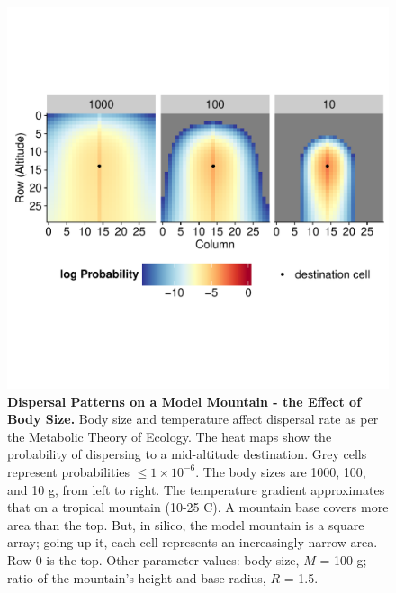 \documentclass[11pt]{article}
\begin{document}
\newpage
\begin{figure}[!hbtp]
		\includegraphics[]{../Results/DispMaps/AreaTemp.pdf}
		\vspace*{-4cm}
		\caption{\textbf{Dispersal Patterns on a Model Mountain - the Effect of Body Size.} Body size and temperature affect dispersal rate as per the Metabolic Theory of Ecology. The heat maps show the probability of dispersing to a mid-altitude destination. Grey cells represent probabilities $\leq 1 \times 10^{-6}$. The body sizes are 1000, 100, and 10 g, from left to right. The temperature gradient approximates that on a tropical mountain (10-25 \degree C). A mountain base covers more area than the top. But, in silico, the model mountain is a square array; going up it, each cell represents an increasingly narrow area. Row 0 is the top. Other parameter values: body size, $M$ = 100 g; ratio of the mountain's height and base radius, $R$ = 1.5.}
\label{DispMapBodySize}
\end{figure}
\end{document}
